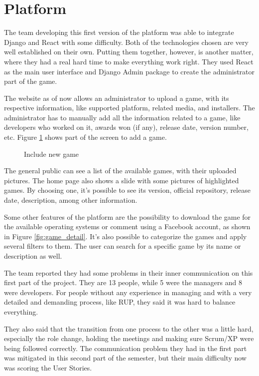 \section{Platform}
\label {sec:platform}

The team developing this first version of the platform was able to integrate Django and React with some difficulty. Both of the technologies chosen are very well established on their own. Putting them together, however, is another matter, where they had a real hard time to make everything work right. They used React as the main user interface and Django Admin package to create the administrator part of the game.

The website as of now allows an administrator to upload a game, with its respective information, like supported platform, related media, and installers.
The administrator has to manually add all the information related to a game, like developers who worked on it, awards won (if any), release date, version number, etc. Figure \ref{fig:include_game1} shows part of the screen to add a game.

\begin{figure}[h!]
\centering
{}
\caption{Include new game}
\label {fig:include_game1}
\end{figure}

The general public can see a list of the available games, with their uploaded pictures. The home page also shows a slide with some pictures of highlighted games. By choosing one, it's possible to see its version, official repository, release date, description, among other information.

Some other features of the platform are the possibility to download the game for the available operating systems or comment using a Facebook account, as shown in Figure \ref{fig:game_detail}. It's also possible to categorize the games and apply several filters to them. The user can search for a specific game by its name or description as well.

The team reported they had some problems in their inner communication on this first part of the project. They are 13 people, while 5 were the managers and 8 were developers. For people without any experience in managing and with a very detailed and demanding process, like RUP, they said it was hard to balance everything.

They also said that the transition from one process to the other was a little hard, especially the role change, holding the meetings and making sure Scrum/XP were being followed correctly. The communication problem they had in the first part was mitigated in this second part of the semester, but their main difficulty now was scoring the User Stories.

